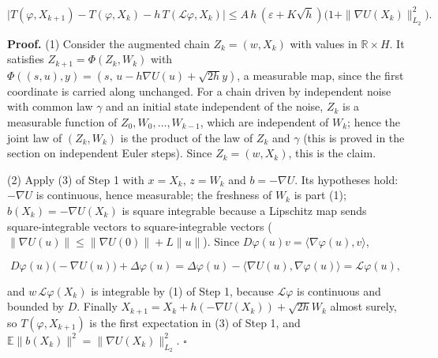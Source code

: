 \documentclass[11pt,a4paper]{article}
\begin{document}
\[\bigl|T(\varphi,X_{k+1})-T(\varphi,X_k)-h\,T(\mathcal L\varphi,X_k)\bigr|\le A\,h\,(\varepsilon+K\sqrt h)\bigl(1+\|\nabla U(X_k)\|_{L_2}^2\bigr).\]


\textbf{Proof.} (1) Consider the augmented chain \(Z_k=(w,X_k)\) with values in \(\mathbb R\times H\). It satisfies \(Z_{k+1}=\Phi(Z_k,W_k)\) with \(\Phi((s,u),y)=(s,\,u-h\nabla U(u)+\sqrt{2h}y)\), a measurable map, since the first coordinate is carried along unchanged. For a chain driven by independent noise with common law \(\gamma\) and an initial state independent of the noise, \(Z_k\) is a measurable function of \(Z_0,W_0,\dots,W_{k-1}\), which are independent of \(W_k\); hence the joint law of \((Z_k,W_k)\) is the product of the law of \(Z_k\) and \(\gamma\) (this is proved in the section on independent Euler steps). Since \(Z_k=(w,X_k)\), this is the claim.




(2) Apply (3) of Step 1 with \(x=X_k\), \(z=W_k\) and \(b=-\nabla U\). Its hypotheses hold: \(-\nabla U\) is continuous, hence measurable; the freshness of \(W_k\) is part (1); \(b(X_k)=-\nabla U(X_k)\) is square integrable because a Lipschitz map sends square-integrable vectors to square-integrable vectors (\(\|\nabla U(u)\|\le\|\nabla U(0)\|+L\|u\|\)). Since \(D\varphi(u)v=\langle\nabla\varphi(u),v\rangle\),


\[D\varphi(u)\bigl(-\nabla U(u)\bigr)+\Delta\varphi(u)=\Delta\varphi(u)-\langle\nabla U(u),\nabla\varphi(u)\rangle=\mathcal L\varphi(u),\]


and \(w\,\mathcal L\varphi(X_k)\) is integrable by (1) of Step 1, because \(\mathcal L\varphi\) is continuous and bounded by \(D\). Finally \(X_{k+1}=X_k+h(-\nabla U(X_k))+\sqrt{2h}W_k\) almost surely, so \(T(\varphi,X_{k+1})\) is the first expectation in (3) of Step 1, and \(\mathbb E\|b(X_k)\|^2=\|\nabla U(X_k)\|_{L_2}^2\). \(\square\)
\end{document}
